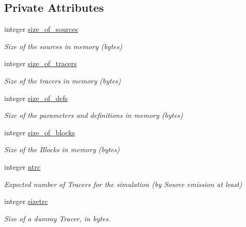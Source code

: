 \subsection*{Private Attributes}
\begin{DoxyCompactItemize}
\item 
integer \mbox{\hyperlink{structsimulation__memory__mod_1_1memory__t_a3e461b40b58c78011285068a2afaf2b8}{size\+\_\+of\+\_\+sources}}
\begin{DoxyCompactList}\small\item\em Size of the sources in memory (bytes) \end{DoxyCompactList}\item 
integer \mbox{\hyperlink{structsimulation__memory__mod_1_1memory__t_a7b1960036177b6612be260699fcdb19a}{size\+\_\+of\+\_\+tracers}}
\begin{DoxyCompactList}\small\item\em Size of the tracers in memory (bytes) \end{DoxyCompactList}\item 
integer \mbox{\hyperlink{structsimulation__memory__mod_1_1memory__t_a14c7c2387ac9b23e6f3b5b4ab0433e50}{size\+\_\+of\+\_\+defs}}
\begin{DoxyCompactList}\small\item\em Size of the parameters and definitions in memory (bytes) \end{DoxyCompactList}\item 
integer \mbox{\hyperlink{structsimulation__memory__mod_1_1memory__t_aa0426bef9384f95d4317ca5b03b63428}{size\+\_\+of\+\_\+blocks}}
\begin{DoxyCompactList}\small\item\em Size of the Blocks in memory (bytes) \end{DoxyCompactList}\item 
integer \mbox{\hyperlink{structsimulation__memory__mod_1_1memory__t_a81817d80225138c83e43d67531f7c1f2}{ntrc}}
\begin{DoxyCompactList}\small\item\em Expected number of Tracers for the simulation (by Source emission at least) \end{DoxyCompactList}\item 
integer \mbox{\hyperlink{structsimulation__memory__mod_1_1memory__t_ad5609fb1063d49593b5aa01c9be61241}{sizetrc}}
\begin{DoxyCompactList}\small\item\em Size of a dummy Tracer, in bytes. \end{DoxyCompactList}\end{DoxyCompactItemize}


